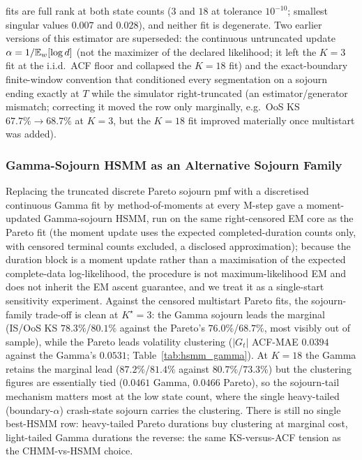 fits are full rank at both state counts ($3$ and $18$ at tolerance $10^{-10}$; smallest singular values $0.007$ and $0.028$), and neither fit is degenerate. Two earlier versions of this estimator are superseded: the continuous untruncated update $\alpha = 1/\mathbb{E}_w[\log d]$ (not the maximizer of the declared likelihood; it left the $K = 3$ fit at the i.i.d.\ ACF floor and collapsed the $K = 18$ fit) and the exact-boundary finite-window convention that conditioned every segmentation on a sojourn ending exactly at $T$ while the simulator right-truncated (an estimator/generator mismatch; correcting it moved the row only marginally, e.g.\ OoS KS $67.7\% \to 68.7\%$ at $K = 3$, but the $K = 18$ fit improved materially once multistart was added).

\subsubsection{Gamma-Sojourn HSMM as an Alternative Sojourn Family}
\label{sec:hsmm_gamma_sojourn}

Replacing the truncated discrete Pareto sojourn pmf with a discretised continuous Gamma fit by method-of-moments at every M-step gave a moment-updated Gamma-sojourn HSMM, run on the same right-censored EM core as the Pareto fit (the moment update uses the expected completed-duration counts only, with censored terminal counts excluded, a disclosed approximation); because the duration block is a moment update rather than a maximisation of the expected complete-data log-likelihood, the procedure is not maximum-likelihood EM and does not inherit the EM ascent guarantee, and we treat it as a single-start sensitivity experiment. Against the censored multistart Pareto fits, the sojourn-family trade-off is clean at $K^\star = 3$: the Gamma sojourn leads the marginal (IS/OoS KS $78.3\%$/$80.1\%$ against the Pareto's $76.0\%$/$68.7\%$, most visibly out of sample), while the Pareto leads volatility clustering ($|G_t|$ ACF-MAE $0.0394$ against the Gamma's $0.0531$; Table~\ref{tab:hsmm_gamma}). At $K = 18$ the Gamma retains the marginal lead ($87.2\%$/$81.4\%$ against $80.7\%$/$73.3\%$) but the clustering figures are essentially tied ($0.0461$ Gamma, $0.0466$ Pareto), so the sojourn-tail mechanism matters most at the low state count, where the single heavy-tailed (boundary-$\alpha$) crash-state sojourn carries the clustering. There is still no single best-HSMM row: heavy-tailed Pareto durations buy clustering at marginal cost, light-tailed Gamma durations the reverse: the same KS-versus-ACF tension as the CHMM-vs-HSMM choice.

